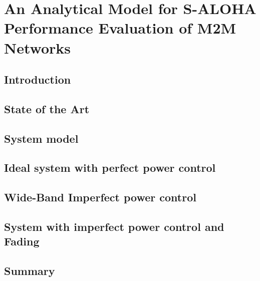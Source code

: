 \chapter{An Analytical Model for S-ALOHA Performance Evaluation of M2M Networks}

\ifpdf
    \graphicspath{{Chapter3/Figs/Raster/}{Chapter3/Figs/PDF/}{Chapter3/Figs/}}
\else
    \graphicspath{{Chapter3/Figs/Vector/}{Chapter3/Figs/}}
\fi

\section{Introduction}

\section{State of the Art}

\section{System model}


\section{Ideal system with perfect power control}


\section{Wide-Band Imperfect power control}


\section{System with imperfect power control and Fading}

\section{Summary}




